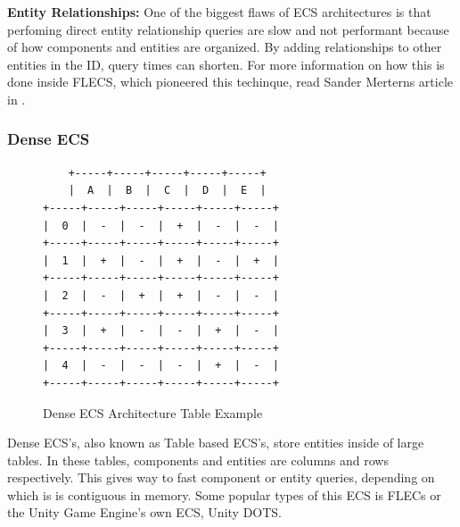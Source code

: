 \textbf{Entity Relationships:}
One of the biggest flaws of ECS architectures is that perfoming direct entity relationship queries are slow and not performant because of how components and entities are organized. By adding relationships to other entities in the ID, query times can shorten. For more information on how this is done inside FLECS, which pioneered this techinque, read Sander Merterns article in \cite{SanderMertensEntityIDs}.

\subsubsection{Dense ECS}

\begin{figure}[htbp]
    \centering
    \begin{verbatim}
    +-----+-----+-----+-----+-----+                                  
    |  A  |  B  |  C  |  D  |  E  |                                  
+-----+-----+-----+-----+-----+-----+                                  
|  0  |  -  |  -  |  +  |  -  |  -  |                                  
+-----+-----+-----+-----+-----+-----+                                  
|  1  |  +  |  -  |  +  |  -  |  +  |                                  
+-----+-----+-----+-----+-----+-----+                                  
|  2  |  -  |  +  |  +  |  -  |  -  |                                  
+-----+-----+-----+-----+-----+-----+                                  
|  3  |  +  |  -  |  -  |  +  |  -  |                                  
+-----+-----+-----+-----+-----+-----+                                  
|  4  |  -  |  -  |  -  |  +  |  -  |                                  
+-----+-----+-----+-----+-----+-----+                                  
    \end{verbatim}
    \caption{Dense ECS Architecture Table Example}
\end{figure}

Dense ECS's, also known as Table based ECS's, store entities inside of large tables. In these tables, components and entities are columns and rows respectively. This gives way to fast component or entity queries, depending on which is is contiguous in memory. Some popular types of this ECS is FLECs or the Unity Game Engine's own ECS, Unity DOTS. \cite{SanderMertensFAQ}

